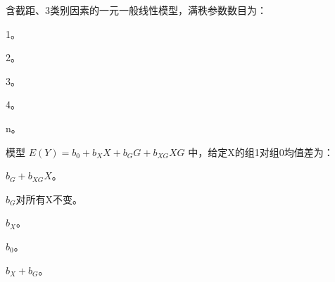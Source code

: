 \par\addvspace{6pt}\noindent\begin{minipage}{\linewidth}


含截距、3类别因素的一元一般线性模型，满秩参数数目为：


\begin{choices}

\item 1。

\item 2。

\item 3。

\item 4。

\item n。

\end{choices}

\end{minipage}\par\vspace{4pt}

\par\addvspace{6pt}\noindent\begin{minipage}{\linewidth}


模型 \(E(Y)=b_0+b_XX+b_GG+b_{XG}XG\) 中，给定X的组1对组0均值差为：


\begin{choices}

\item \(b_G+b_{XG}X\)。

\item \(b_G\)对所有X不变。

\item \(b_X\)。

\item \(b_0\)。

\item \(b_X+b_G\)。

\end{choices}

\end{minipage}\par\vspace{4pt}

